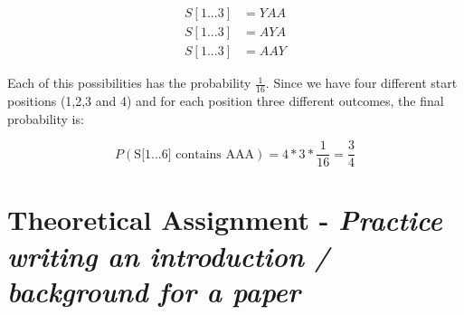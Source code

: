 \documentclass[%
   10pt,              %
   nenglish,           %
   a4paper,           %
   DIV11,             %
]{scrartcl}%
\begin{document}
\begin{align}
 S[1...3] &= YAA \nonumber \\
 S[1...3] &= AYA \nonumber \\
 S[1...3] &= AAY \nonumber 
\end{align}

\noindent Each of this possibilities has the probability $\frac{1}{16}$. Since we have four different 
start positions (1,2,3 and 4) and for each position three different outcomes, the final probability 
is:

\begin{equation}
 P(\textrm{S[1...6] contains AAA}) = 4 * 3 * \frac{1}{16} = \frac{3}{4} \nonumber
\end{equation}



\section*{Theoretical Assignment - \textsl{Practice writing an introduction / background for a paper}}

%
%
 
\end{document}
